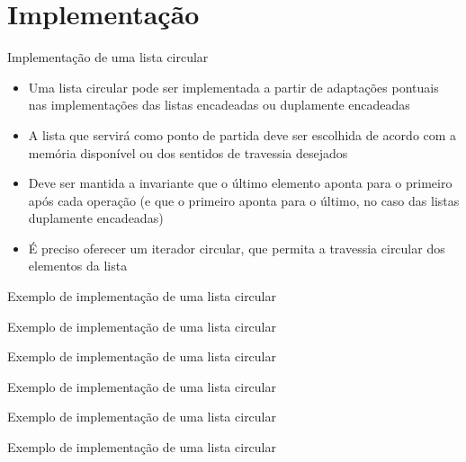 \section{Implementação}

\begin{frame}[fragile]{Implementação de uma lista circular}

    \begin{itemize}
        \item Uma lista circular pode ser implementada a partir de adaptações pontuais
            nas implementações das listas encadeadas ou duplamente encadeadas

        \item A lista que servirá como ponto de partida deve ser escolhida de acordo com
            a memória disponível ou dos sentidos de travessia desejados

        \item Deve ser mantida a invariante que o último elemento aponta para o primeiro
            após cada operação (e que o primeiro aponta para o último, no caso das 
            listas duplamente encadeadas)

        \item É preciso oferecer um iterador circular, que permita a travessia circular dos
            elementos da lista
    \end{itemize}

\end{frame}

\begin{frame}[fragile]{Exemplo de implementação de uma lista circular}
\end{frame}

\begin{frame}[fragile]{Exemplo de implementação de uma lista circular}
\end{frame}

\begin{frame}[fragile]{Exemplo de implementação de uma lista circular}
\end{frame}

\begin{frame}[fragile]{Exemplo de implementação de uma lista circular}
\end{frame}

\begin{frame}[fragile]{Exemplo de implementação de uma lista circular}
\end{frame}

\begin{frame}[fragile]{Exemplo de implementação de uma lista circular}
\end{frame}
